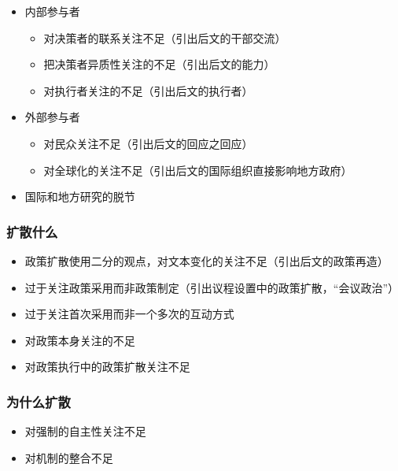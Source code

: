 \documentclass[
  12pt,
]{ctexart}
\begin{document}
\begin{itemize}
\item
  内部参与者

  \begin{itemize}
  \item
    对决策者的联系关注不足（引出后文的干部交流）
  \item
    把决策者异质性关注的不足（引出后文的能力）
  \item
    对执行者关注的不足（引出后文的执行者）
  \end{itemize}
\item
  外部参与者

  \begin{itemize}
  \item
    对民众关注不足（引出后文的回应之回应）
  \item
    对全球化的关注不足（引出后文的国际组织直接影响地方政府）
  \end{itemize}
\item
  国际和地方研究的脱节
\end{itemize}

\hypertarget{ux6269ux6563ux4ec0ux4e48}{%
\subsubsection{扩散什么}\label{ux6269ux6563ux4ec0ux4e48}}

\begin{itemize}
\item
  政策扩散使用二分的观点，对文本变化的关注不足（引出后文的政策再造）
\item
  过于关注政策采用而非政策制定（引出议程设置中的政策扩散，``会议政治''）
\item
  过于关注首次采用而非一个多次的互动方式
\item
  对政策本身关注的不足
\item
  对政策执行中的政策扩散关注不足
\end{itemize}

\hypertarget{ux4e3aux4ec0ux4e48ux6269ux6563}{%
\subsubsection{为什么扩散}\label{ux4e3aux4ec0ux4e48ux6269ux6563}}

\begin{itemize}
\item
  对强制的自主性关注不足
\item
  对机制的整合不足
\end{itemize}
\end{document}
